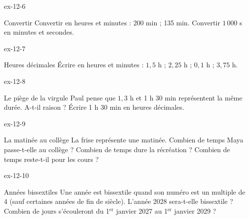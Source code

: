 \begin{blocLivre}{ex-12-6}\begin{exercice}[2]{Convertir}
Convertir en heures et minutes : 200 min ; 135 min. Convertir $1\,000$ s en minutes et secondes.
\end{exercice}\end{blocLivre}
\begin{blocLivre}{ex-12-7}\begin{exercice}[2]{Heures décimales}
Écrire en heures et minutes : $1{,}5$ h ; $2{,}25$ h ; $0{,}1$ h ; $3{,}75$ h.
\end{exercice}\end{blocLivre}
\begin{blocLivre}{ex-12-8}\begin{exercice}[2]{Le piège de la virgule}
Paul pense que $1{,}3$ h et 1 h 30 min représentent la même durée. A-t-il raison ? Écrire 1 h 30 min en heures décimales.
\end{exercice}\end{blocLivre}
\begin{blocLivre}{ex-12-9}\begin{exercice}[2]{La matinée au collège}
La frise représente une matinée. Combien de temps Maya passe-t-elle au collège ? Combien de temps dure la récréation ? Combien de temps reste-t-il pour les cours ?
\label{fig-ex-12-9}
\end{exercice}\end{blocLivre}
\begin{blocLivre}{ex-12-10}\begin{exercice}[2]{Années bissextiles}
Une année est bissextile quand son numéro est un multiple de 4 (sauf certaines années de fin de siècle). L’année 2028 sera-t-elle bissextile ? Combien de jours s’écouleront du 1$^{\text{er}}$ janvier 2027 au 1$^{\text{er}}$ janvier 2029 ?
\end{exercice}\end{blocLivre}

